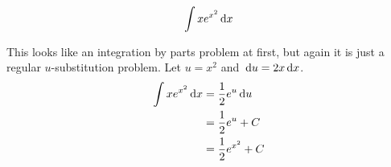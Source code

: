 \begin{ex}
  \[
    \int x e^{x^2} \,\mathrm{d} x
    \]
    \begin{sol}
      This looks like an integration by parts problem at first, but again it is just a regular $u$-substitution problem.
      Let $u=x^2$ and $\,\mathrm{d} u=2x\,\mathrm{d} x$.
      \begin{align*}
        \int x e^{x^2} \,\mathrm{d} x &= \frac{1}{2}e^u \,\mathrm{d} u \\
        &= \frac{1}{2} e^u +C \\
        &= \frac{1}{2}e^{x^2} +C
      \end{align*}
    \end{sol}
\end{ex}
%
